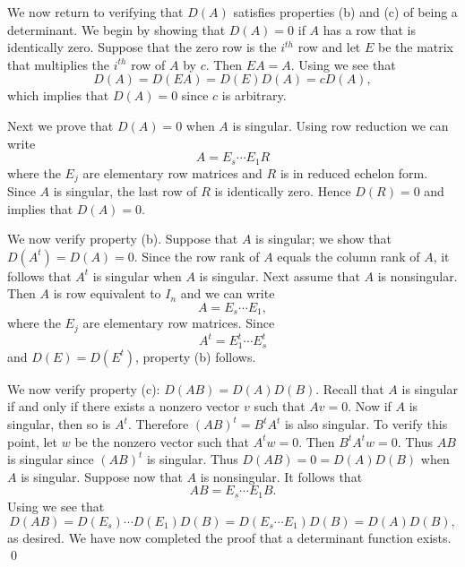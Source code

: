 We now return to verifying that $D(A)$ satisfies properties (b)
and (c) of being a determinant.  We begin by showing that
$D(A)=0$ if $A$ has a row that is identically zero.  Suppose
that the zero row is the $i^{th}$ row and let $E$ be the matrix
that multiplies the $i^{th}$ row of $A$ by $c$.  Then $EA=A$.
Using  we see that
\[
D(A)=D(EA)=D(E)D(A)=cD(A),
\]
which implies that $D(A)=0$ since $c$ is arbitrary.

Next we prove that $D(A)=0$ when $A$ is singular.  Using row 
reduction we can write
\[
A=E_s\cdots E_1R
\]
where the $E_j$ are elementary row matrices and $R$ is in
reduced echelon form.  
Since $A$ is singular, the last row of
$R$ is identically zero.  Hence $D(R)=0$ and 
implies that $D(A)=0$.  

We now verify property (b).  Suppose that $A$ is singular; we
show that $D(A^t)=D(A)=0$.  Since the row rank of $A$ equals the
column rank of $A$, it follows that $A^t$ is singular when $A$
is singular.  Next assume that $A$ is nonsingular.  Then $A$ is
row equivalent to $I_n$ and we can write
\begin{equation}  \label{e:Adecomp}
A=E_s\cdots E_1,
\end{equation}
where the $E_j$ are elementary row matrices.  Since  
\[
A^t = E_1^t\cdots E_s^t
\]
and $D(E)=D(E^t)$, property (b) follows. 

We now verify property (c): $D(AB)=D(A)D(B)$.  Recall that $A$
is singular if and only if there exists a nonzero vector $v$
such that $Av=0$.  Now if $A$ is singular, then so is $A^t$.
Therefore $(AB)^t=B^tA^t$ is also singular.  To verify this
point, let $w$ be the nonzero vector such that $A^tw=0$.  Then
$B^tA^tw=0$.  Thus $AB$ is singular since $(AB)^t$ is singular.
Thus $D(AB)=0=D(A)D(B)$ when $A$ is singular.  Suppose now that
$A$ is nonsingular.  It follows that 
\[
AB = E_s\cdots E_1B.
\]
Using  we see that
\[
D(AB)=D(E_s)\cdots D(E_1)D(B) = D(E_s\cdots E_1)D(B) = D(A)D(B),
\]
as desired. We have now completed the proof that a determinant
function exists. \qed
